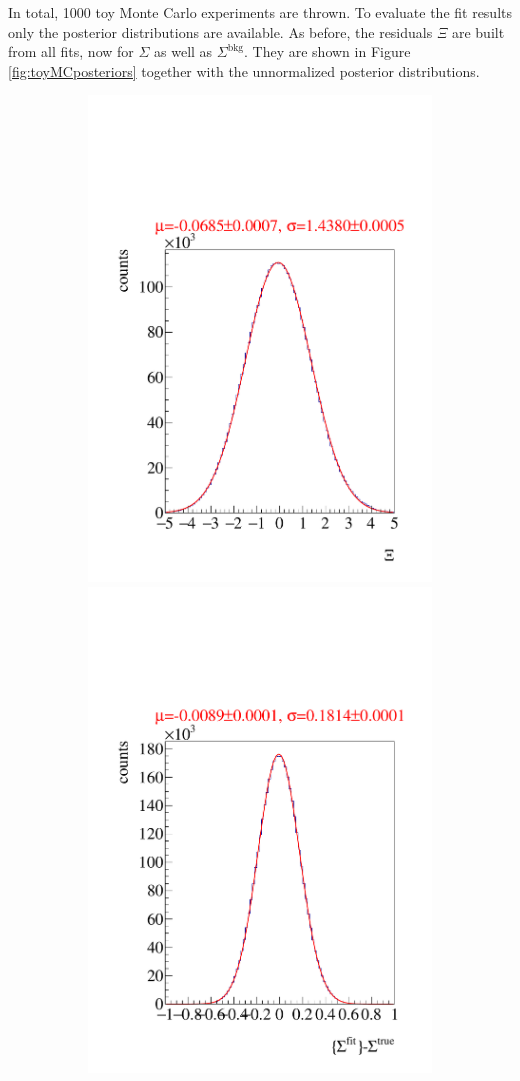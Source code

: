 In total, 1000 toy Monte Carlo experiments are thrown. To evaluate the fit results only the posterior distributions are available. As before, the residuals $\Xi$ are built from all fits, now for $\Sigma$ as well as $\Sigma^\text{bkg}$. They are shown in Figure \ref{fig:toyMCposteriors} together with the unnormalized posterior distributions. 
\begin{figure}[htbp]
	\centering
	\begin{subfigure}{\linewidth}
		\includegraphics[width=.49\linewidth]{../bayes/event_based_fit/plots/combined_post_add.pdf}
		\includegraphics[width=.49\linewidth]{../bayes/event_based_fit/plots/combined_post_add_raw.pdf}
	\end{subfigure}
	\begin{subfigure}{\linewidth}

\end{subfigure}
\end{figure}
